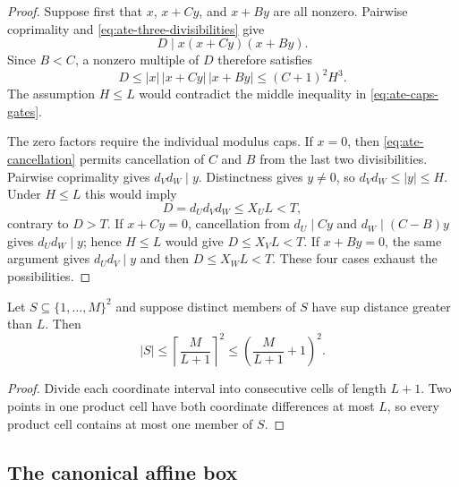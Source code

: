 \begin{proof}
Suppose first that $x$, $x+Cy$, and $x+By$ are all nonzero.  Pairwise
coprimality and \eqref{eq:ate-three-divisibilities} give
\[
 D\mid x(x+Cy)(x+By).
\]
Since $B<C$, a nonzero multiple of $D$ therefore satisfies
\begin{equation}\label{eq:ate-cubic-bound}
 D\le |x|\,|x+Cy|\,|x+By|
   \le (C+1)^2H^3.
\end{equation}
The assumption $H\le L$ would contradict the middle inequality in
\eqref{eq:ate-caps-gates}.

The zero factors require the individual modulus caps.  If $x=0$, then
\eqref{eq:ate-cancellation} permits cancellation of $C$ and $B$ from the
last two divisibilities.  Pairwise coprimality gives $d_Vd_W\mid y$.
Distinctness gives $y\ne0$, so $d_Vd_W\le |y|\le H$.  Under $H\le L$ this
would imply
\[
 D=d_Ud_Vd_W\le X_UL<T,
\]
contrary to $D>T$.  If $x+Cy=0$, cancellation from
$d_U\mid Cy$ and $d_W\mid(C-B)y$ gives $d_Ud_W\mid y$; hence $H\le L$
would give $D\le X_VL<T$.  If $x+By=0$, the same argument gives
$d_Ud_V\mid y$ and then $D\le X_WL<T$.  These four cases exhaust the
possibilities.
\end{proof}

\begin{proposition}
\label{prop:ate-packing}
Let $S\subseteq\{1,\ldots,M\}^2$ and suppose distinct members of $S$ have
sup distance greater than $L$.  Then
\begin{equation}\label{eq:ate-packing}
 |S|\le \left\lceil\frac{M}{L+1}\right\rceil^2
 \le \left(\frac{M}{L+1}+1\right)^2.
\end{equation}
\end{proposition}

\begin{proof}
Divide each coordinate interval into consecutive cells of length $L+1$.
Two points in one product cell have both coordinate differences at most
$L$, so every product cell contains at most one member of $S$.
\end{proof}

\subsection{The canonical affine box}


